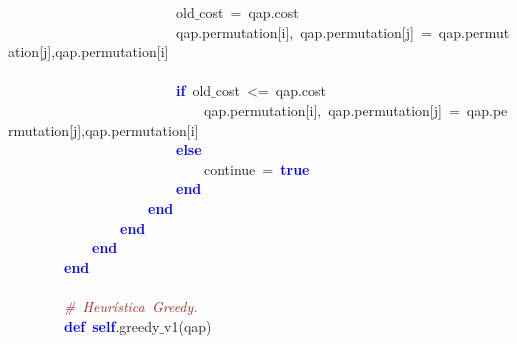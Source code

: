 \mbox{}\ \ \ \ \ \ \ \ \ \ \ \ \ \ \ \ \ \ \ \ \ \ \ \ old$\_$cost\ \textcolor{BrickRed}{=}\ qap\textcolor{BrickRed}{.}cost \\
\mbox{}\ \ \ \ \ \ \ \ \ \ \ \ \ \ \ \ \ \ \ \ \ \ \ \ qap\textcolor{BrickRed}{.}permutation\textcolor{BrickRed}{[}i\textcolor{BrickRed}{],}\ qap\textcolor{BrickRed}{.}permutation\textcolor{BrickRed}{[}j\textcolor{BrickRed}{]}\ \textcolor{BrickRed}{=}\ qap\textcolor{BrickRed}{.}permutation\textcolor{BrickRed}{[}j\textcolor{BrickRed}{],}qap\textcolor{BrickRed}{.}permutation\textcolor{BrickRed}{[}i\textcolor{BrickRed}{]}\  \\
\mbox{}\ \ \ \ \ \ \ \ \ \ \ \ \ \ \ \ \ \ \ \ \ \ \ \  \\
\mbox{}\ \ \ \ \ \ \ \ \ \ \ \ \ \ \ \ \ \ \ \ \ \ \ \ \textbf{\textcolor{Blue}{if}}\ old$\_$cost\ \textcolor{BrickRed}{\textless{}=}\ qap\textcolor{BrickRed}{.}cost \\
\mbox{}\ \ \ \ \ \ \ \ \ \ \ \ \ \ \ \ \ \ \ \ \ \ \ \ \ \ \ \ qap\textcolor{BrickRed}{.}permutation\textcolor{BrickRed}{[}i\textcolor{BrickRed}{],}\ qap\textcolor{BrickRed}{.}permutation\textcolor{BrickRed}{[}j\textcolor{BrickRed}{]}\ \textcolor{BrickRed}{=}\ qap\textcolor{BrickRed}{.}permutation\textcolor{BrickRed}{[}j\textcolor{BrickRed}{],}qap\textcolor{BrickRed}{.}permutation\textcolor{BrickRed}{[}i\textcolor{BrickRed}{]} \\
\mbox{}\ \ \ \ \ \ \ \ \ \ \ \ \ \ \ \ \ \ \ \ \ \ \ \ \textbf{\textcolor{Blue}{else}}\ \ \ \  \\
\mbox{}\ \ \ \ \ \ \ \ \ \ \ \ \ \ \ \ \ \ \ \ \ \ \ \ \ \ \ \ continue\ \textcolor{BrickRed}{=}\ \textbf{\textcolor{Blue}{true}} \\
\mbox{}\ \ \ \ \ \ \ \ \ \ \ \ \ \ \ \ \ \ \ \ \ \ \ \ \textbf{\textcolor{Blue}{end}} \\
\mbox{}\ \ \ \ \ \ \ \ \ \ \ \ \ \ \ \ \ \ \ \ \textbf{\textcolor{Blue}{end}} \\
\mbox{}\ \ \ \ \ \ \ \ \ \ \ \ \ \ \ \ \textbf{\textcolor{Blue}{end}} \\
\mbox{}\ \ \ \ \ \ \ \ \ \ \ \ \textbf{\textcolor{Blue}{end}} \\
\mbox{}\ \ \ \ \ \ \ \ \textbf{\textcolor{Blue}{end}} \\
\mbox{}\ \ \ \ \ \ \ \  \\
\mbox{}\ \ \ \ \ \ \ \ \textit{\textcolor{Brown}{\#\ Heurística\ Greedy.}} \\
\mbox{}\ \ \ \ \ \ \ \ \textbf{\textcolor{Blue}{def}}\ \textbf{\textcolor{Blue}{self}}\textcolor{BrickRed}{.}greedy$\_$v1\textcolor{BrickRed}{(}qap\textcolor{BrickRed}{)} \\
